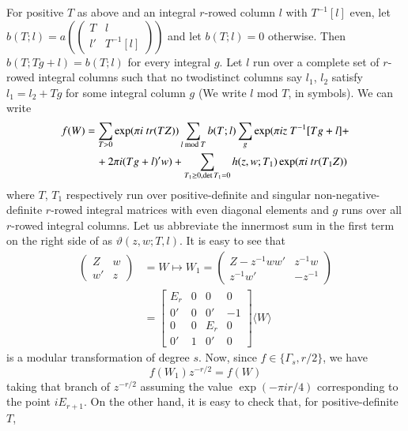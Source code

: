 For positive $T$ as above and an integral $r$-rowed column $l$ with
$T^{-1}[l]$ even, let $b(T;l)=a\left(\left(\begin{smallmatrix} T & l\\
l' & T^{-1}[l]\end{smallmatrix}\right)\right)$ and let $b(T;l)=0$
otherwise. Then $b(T;Tg+l)=b(T;l)$ for every integral $g$. Let $l$ run
over a complete set of $r$-rowed integral columns such that no
two\pageoriginale distinct columns say $l_{1}$, $l_{2}$ satisfy
$l_{1}=l_{2}+Tg$ for some integral column $g$ (We write
$l\text{~mod~}T$, in symbols). We can write
\begin{align}
f(W) &= \sum_{T>0}\exp (\pi i\
tr(TZ))\sum_{l\text{~mod~}T}b(T;l)\sum_{g}\exp (\pi iz\
T^{-1}[Tg+l]+\notag\\
&\quad +2\pi i (Tg+l)'w)+\sum_{T_{1}\geq 0,\det
T_{1}=0}h(z,w;T_{1})\exp(\pi i\ tr(T_{1}Z))\label{art02-eq3}
\end{align}
where $T$, $T_{1}$ respectively run over positive-definite and
singular non-negative-definite $r$-rowed integral matrices with even
diagonal elements and $g$ runs over all $r$-rowed integral
columns. Let us abbreviate the innermost sum in the first term on the
right side of \cite{art02-key3} as $\vartheta(z,w;T,l)$. It is easy to
see that
\begin{align*}
\begin{pmatrix}
Z & w\\
w' & z
\end{pmatrix}
&= W\mapsto W_{1}=
\begin{pmatrix}
Z-z^{-1}ww' & z^{-1}w\\
z^{-1}w' & -z^{-1}
\end{pmatrix}\\
&= 
\begin{bmatrix}
E_{r} & 0 & 0 & 0\\
0' & 0 & 0' & -1\\
0 & 0 & E_{r} & 0\\
0' & 1 & 0' & 0
\end{bmatrix}
\langle W\rangle
\end{align*}
is a modular transformation of degree $s$. Now, since
$f\in \{\Gamma_{s},r/2\}$, we have
\begin{equation}
f(W_{1})z^{-r/2}=f(W)\label{art02-eq4}
\end{equation}
taking that branch of $z^{-r/2}$ assuming the value $\exp(-\pi ir/4)$
corresponding to the point $iE_{r+1}$. On the other hand, it is easy
to check that, for positive-definite $T$,
